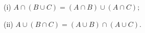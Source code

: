 (i) $A \cap (B \cup C) = (A \cap B) \cup (A \cap C);$

(ii) $A \cup (B \cap C) = (A \cup B) \cap (A \cup C).$